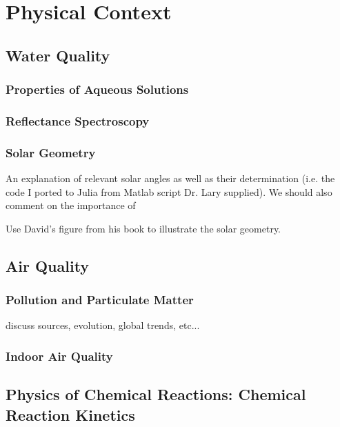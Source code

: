 \chapter{Physical Context}


\section{Water Quality}

\subsection{Properties of Aqueous Solutions}
\subsection{Reflectance Spectroscopy}
\subsection{Solar Geometry}

An explanation of relevant solar angles as well as their determination (i.e. the code I ported to Julia from Matlab script Dr. Lary supplied). We should also comment on the importance of

Use David's figure from his book to illustrate the solar geometry.



\section{Air Quality}
\subsection{Pollution and Particulate Matter}
discuss sources, evolution, global trends, etc...
\subsection{Indoor Air Quality}

\section{Physics of Chemical Reactions: Chemical Reaction Kinetics}


